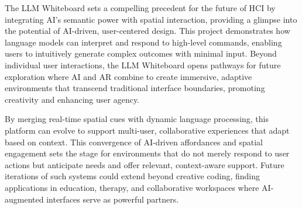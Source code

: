 
The LLM Whiteboard sets a compelling precedent for the future of HCI by integrating AI’s semantic power with spatial interaction, providing a glimpse into the potential of AI-driven, user-centered design.
This project demonstrates how language models can interpret and respond to high-level commands, enabling users to intuitively generate complex outcomes with minimal input.%
Beyond individual user interactions, the LLM Whiteboard opens pathways for future exploration where AI and AR combine to create immersive, adaptive environments that transcend traditional interface boundaries, promoting creativity and enhancing user agency.

By merging real-time spatial cues with dynamic language processing, this platform can evolve to support multi-user, collaborative experiences that adapt based on context.
This convergence of AI-driven affordances and spatial engagement sets the stage for environments that do not merely respond to user actions but anticipate needs and offer relevant, context-aware support.
Future iterations of such systems could extend beyond creative coding, finding applications in education, therapy, and collaborative workspaces where AI-augmented interfaces serve as powerful partners.